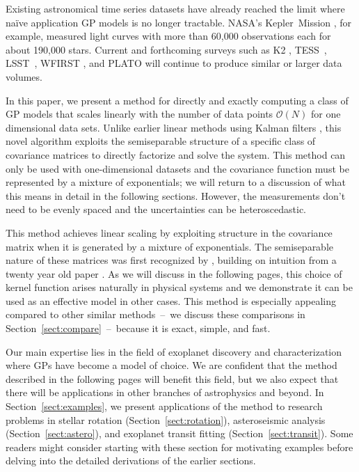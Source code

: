 \documentclass[manuscript, letterpaper]{aastex6}
\newcommand{\project}[1]{\textsf{#1}}
\newcommand{\kepler}{\project{Kepler}}
\newcommand{\lsst}{\project{LSST}}
\newcommand{\tess}{\project{TESS}}
\newcommand{\sectionname}{Section}
\newcommand{\sectref}[1]{\ref{sect:#1}}
\newcommand{\Sect}[1]{\sectionname~\sectref{#1}}
\newcommand{\sect}[1]{\Sect{#1}}
\newcommand{\response}[1]{{\color{blue}#1}}
\begin{document}
\response{Existing astronomical time series datasets have already reached the
limit where na\"ive application GP models is no longer tractable.
NASA's \kepler\ Mission \citep{Borucki:2010}, for example, measured light
curves with more than 60,000 observations each for about 190,000 stars.
Current and forthcoming surveys such as \project{K2} \citep{Howell:2014},
\tess\ \citep{Ricker:2014}, \lsst\ \citep{Ivezic:2008}, \project{WFIRST}
\citep{Spergel:2015}, and PLATO \citep{Rauer:2014} will continue to produce
similar or larger data volumes.}

In this paper, we present a method for directly and exactly computing a class
of GP models that scales linearly with the number of data points
$\mathcal{O}(N)$ for one dimensional data sets.
\response{Unlike earlier linear methods using Kalman filters \citep[for
example,][]{Kelly:2014}, this novel algorithm exploits the semiseparable
structure of a specific class of covariance matrices to directly factorize and
solve the system.
}
This method can only be used with one-dimensional datasets and the covariance
function must be represented by a mixture of exponentials; we will return to a
discussion of what this means in detail in the following sections.
However, the measurements don't need to be evenly spaced and the uncertainties
can be heteroscedastic.

This method achieves linear scaling by exploiting structure in the covariance
matrix when it is generated by a mixture of exponentials.
\response{The semiseparable nature of these matrices was first recognized by
\citet{Ambikasaran:2015}, building on intuition from a twenty year old paper
\citep{Rybicki:1995}.}
As we will discuss in the following pages, this choice of kernel function
arises naturally in physical systems and we demonstrate it can be used as
an effective model in other cases.
This method is especially appealing compared to other similar methods~--~we
discuss these comparisons in \sect{compare}~--~because it is exact, simple,
and fast.

Our main expertise lies in the field of exoplanet discovery and
characterization where GPs have become a model of choice.
We are confident that the method described in the following pages will benefit
this field, but we also expect that there will be applications in other
branches of astrophysics and beyond.
In \sect{examples}, we present applications of the method to research problems
in stellar rotation (\sect{rotation}), asteroseismic analysis (\sect{astero}),
and exoplanet transit fitting (\sect{transit}).
Some readers might consider starting with these section for motivating
examples before delving into the detailed derivations of the earlier sections.
\end{document}
